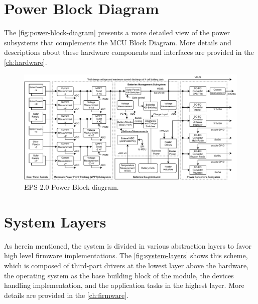 \section{Power Block Diagram}

The \autoref{fig:power-block-diagram} presents a more detailed view of the power subsystems that complements the MCU Block Diagram. More details and descriptions about these hardware components and interfaces are provided in the \autoref{ch:hardware}.

\begin{figure}[!ht]
    \begin{center}
        \includegraphics[width=\textwidth]{figures/eps2_power_diagram.pdf}
        \caption{EPS 2.0 Power Block diagram.}
        \label{fig:power-block-diagram}
    \end{center}
\end{figure}

\section{System Layers} \label{sec:system-layers}

As herein mentioned, the system is divided in various abstraction layers to favor high level firmware implementations. The \autoref{fig:system-layers} shows this scheme, which is composed of third-part drivers at the lowest layer above the hardware, the operating system as the base building block of the module, the devices handling implementation, and the application tasks in the highest layer. More details are provided in the \autoref{ch:firmware}.

